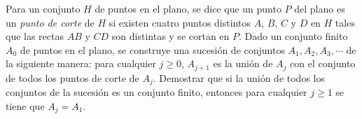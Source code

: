 Para un conjunto $H$ de puntos en el plano, se dice que un punto $P$ del plano es un \emph{punto de corte} de $H$ si existen cuatro puntos distintos $A$, $B$, $C$ y $D$ en $H$ tales que las rectas $AB$ y $CD$ son distintas y se cortan en $P$. \newline 
Dado un conjunto finito $A_0$ de puntos en el plano, se construye una sucesión de conjuntos $A_1, A_2, A_3, \cdots$ de la siguiente manera: para cualquier $j \geq 0$, $A_{j+1}$ es la unión de $A_j$ con el conjunto de todos los puntos de corte de $A_j$. \newline 
Demostrar que si la unión de todos los conjuntos de la sucesión es un conjunto finito, entonces para cualquier $j \geq 1$ se tiene que $A_j = A_1$.

